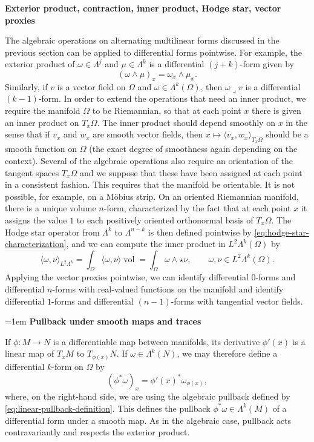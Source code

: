 \medskip\noindent\textbf{{Exterior product, contraction, inner product, Hodge star, vector proxies}}\par
{The algebraic operations on alternating multilinear forms discussed in the previous section can be applied to differential forms pointwise. For example, the exterior product of $\omega\in\Lambda^j$ and $\mu\in\Lambda^k$ is a differential $(j+k)$-form given by}
\[
(\omega\wedge\mu)_x=\omega_x\wedge\mu_x.
\]
{Similarly, if $v$ is a vector field on $\Omega$ and $\omega\in\Lambda^k(\Omega)$, then $\omega\lrcorner v$ is a differential $(k-1)$-form. In order to extend the operations that need an inner product, we require the manifold $\Omega$ to be Riemannian, so that at each point $x$ there is given an inner product on $T_x\Omega$. The inner product should depend smoothly on $x$ in the sense that if $v_x$ and $w_x$ are smooth vector fields, then $x\mapsto\langle v_x,w_x\rangle_{T_x\Omega}$ should be a smooth function on $\Omega$ (the exact degree of smoothness again depending on the context). Several of the algebraic operations also require an orientation of the tangent spaces $T_x\Omega$ and we suppose that these have been assigned at each point in a consistent fashion. This requires that the manifold be orientable. It is not possible, for example, on a Möbius strip. On an oriented Riemannian manifold, there is a unique volume $n$-form, characterized by the fact that at each point $x$ it assigns the value $1$ to each positively oriented orthonormal basis of $T_x\Omega$. The Hodge star operator from $\Lambda^k$ to $\Lambda^{n-k}$ is then defined pointwise by \eqref{eq:hodge-star-characterization}, and we can compute the inner product in $L^2\Lambda^k(\Omega)$ by}
\[
\langle\omega,\nu\rangle_{L^2\Lambda^k}=\int_\Omega\langle\omega,\nu\rangle\operatorname{vol}=\int_\Omega\omega\wedge\star\nu,\qquad\omega,\nu\in L^2\Lambda^k(\Omega).
\]
{Applying the vector proxies pointwise, we can identify differential $0$-forms and differential $n$-forms with real-valued functions on the manifold and identify differential $1$-forms and differential $(n-1)$-forms with tangential vector fields.}

\begingroup\emergencystretch=1em
\medskip\noindent\textbf{{Pullback under smooth maps and traces}}\par
{If $\phi:M\to N$ is a differentiable map between manifolds, its derivative $\phi'(x)$ is a linear map of $T_xM$ to $T_{\phi(x)}N$. If $\omega\in\Lambda^k(N)$, we may therefore define a differential $k$-form on $\Omega$ by}
\begin{equation}\label{eq:smooth-pullback-definition}
(\phi^*\omega)_x=\phi'(x)^*\omega_{\phi(x)},
\end{equation}
{where, on the right-hand side, we are using the algebraic pullback defined by \eqref{eq:linear-pullback-definition}. This defines the pullback $\phi^*\omega\in\Lambda^k(M)$ of a differential form under a smooth map. As in the algebraic case, pullback acts contravariantly and respects the exterior product.}

